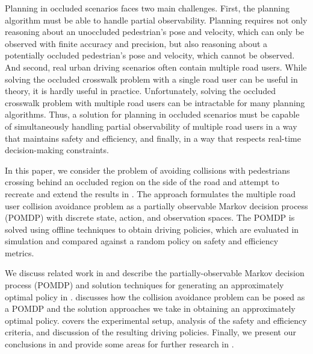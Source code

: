 \documentclass[conference]{IEEEtran}
\begin{document}
Planning in occluded scenarios faces two main challenges. First, the planning algorithm must be able to handle partial observability. Planning requires not only reasoning about an unoccluded pedestrian's pose and velocity, which can only be observed with finite accuracy and precision, but also reasoning about a potentially occluded pedestrian's pose and velocity, which cannot be observed. And second, real urban driving scenarios often contain multiple road users. While solving the occluded crosswalk problem with a single road user can be useful in theory, it is hardly useful in practice. Unfortunately, solving the occluded crosswalk problem with multiple road users can be intractable for many planning algorithms. Thus, a solution for planning in occluded scenarios must be capable of simultaneously handling partial observability of multiple road users in a way that maintains safety and efficiency, and finally, in a way that respects real-time decision-making constraints.

In this paper, we consider the problem of avoiding collisions with pedestrians crossing behind an occluded region on the side of the road and attempt to recreate and extend the results in \cite{Bouton2018ScalableDriving}. The approach formulates the multiple road user collision avoidance problem as a partially observable Markov decision process (POMDP) with discrete state, action, and observation spaces. The POMDP is solved using offline techniques to obtain driving policies, which are evaluated in simulation and compared against a random policy on safety and efficiency metrics. 

We discuss related work in  and describe the partially-observable Markov decision process (POMDP) and solution techniques for generating an approximately optimal policy in .  discusses how the collision avoidance problem can be posed as a POMDP and the solution approaches we take in obtaining an approximately optimal policy.  covers the experimental setup, analysis of the safety and efficiency criteria, and discussion of the resulting driving policies. Finally, we present our conclusions in  and provide some areas for further research in .
\end{document}
